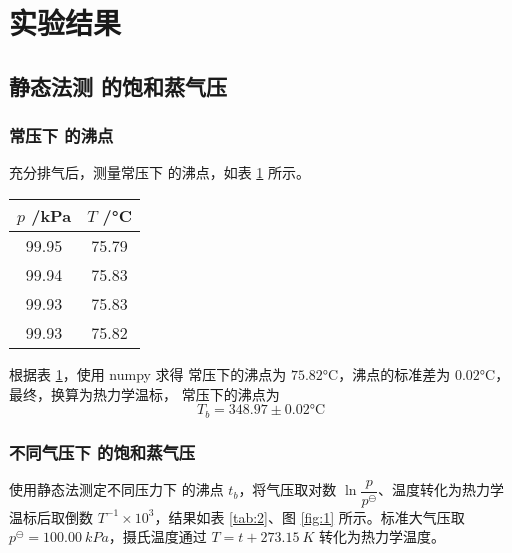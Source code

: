 \section{实验结果}

\subsection{静态法测  的饱和蒸气压}

\subsubsection{常压下  的沸点}

充分排气后，测量常压下  的沸点，如表 \ref{tab:1} 所示。

\begin{table}[htbp]
    \centering
    
    \begin{tabular}{cc}
    \toprule
    \( p \) /\si{kPa} & \( T \) /\si{\celsius} \\
    \midrule
    99.95 & 75.79 \\
    99.94 & 75.83 \\
    99.93 & 75.83 \\
    99.93 & 75.82 \\
    \bottomrule
    \end{tabular}
    \label{tab:1}
\end{table}

根据表 \ref{tab:1}，使用 numpy 求得  常压下的沸点为 \( 75.82 \)\si{\celsius}，沸点的标准差为 \( 0.02 \)\si{\celsius}，最终，换算为热力学温标， 常压下的沸点为
\[
T_b = 348.97 \pm 0.02 \si{\celsius}
\]

\subsubsection{不同气压下  的饱和蒸气压}

使用静态法测定不同压力下  的沸点 \(t_b\)，将气压取对数 \(\ln \dfrac{p}{p^\ominus}\)、温度转化为热力学温标后取倒数 \(T^{-1}\times10^{3}\)，结果如表 \ref{tab:2}、图 \ref{fig:1} 所示。标准大气压取 \(p^\ominus=100.00\si{~kPa}\)，摄氏温度通过 \(T = t + 273.15\si{~K}\) 转化为热力学温度。

